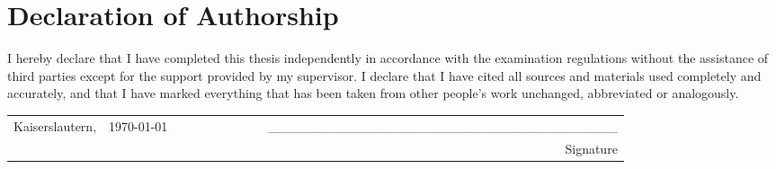 \section*{Declaration of Authorship}
I hereby declare that I have completed this thesis independently in accordance with the examination regulations without the assistance of third parties except for the support provided by my supervisor. I declare that I have cited all sources and materials used completely and accurately, and that I have marked everything that has been taken from other people's work unchanged, abbreviated or analogously.
\newline
\newline
\begin{table}[h]
\begin{tabular}{lllllllllr}
Kaiserslautern, & \today & & & & & & & & \_\_\_\_\_\_\_\_\_\_\_\_\_\_\_\_\_\_\_\_\_\_\_\_\_\_\_\_\_\_\_\_\_\_\_\_\_ \\
 & & & & & & & & & {\small Signature }                                       
\end{tabular}
\end{table}

\newpage
\thispagestyle{empty}
\section*{}
\newpage
